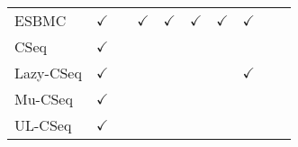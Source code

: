 \begin{landscape}
\begin{table}[ht]
\begin{tabular}{|l|c|c|c|c|c|c|c|c|c|}
ESBMC      & $\checkmark$ &              & $\checkmark$ & $\checkmark$ & $\checkmark$ & $\checkmark$ & $\checkmark$ &              &                \\
CSeq       & $\checkmark$ &              &              &              &              &              &              &              &                \\
Lazy-CSeq  & $\checkmark$ &              &              &              &              &              & $\checkmark$ &              &                \\
Mu-CSeq    & $\checkmark$ &              &              &              &              &              &              &              &                \\
UL-CSeq    & $\checkmark$ &              &              &              &              &              &              &              &                \\ \hline
\end{tabular}
\label{tab:prop_type_table}
\end{table}

\end{landscape}
